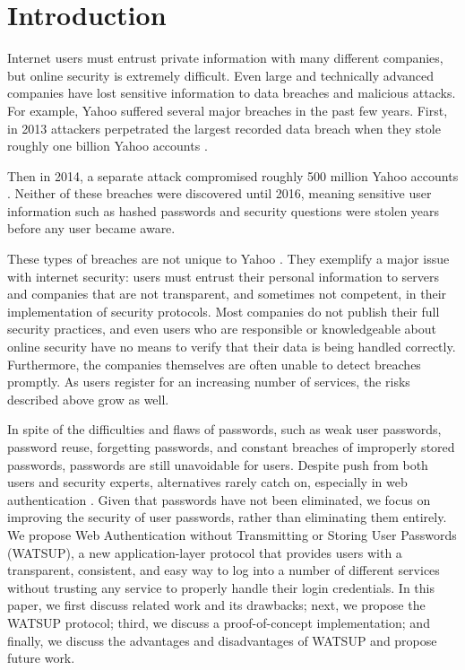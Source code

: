 \section{Introduction}
\label{sec:intro}

Internet users must entrust private information with many different companies, but online security is extremely difficult. Even large and technically advanced companies have lost sensitive information to data breaches and malicious attacks. For example, Yahoo suffered several major breaches in the past few years. First, in 2013 attackers perpetrated the largest recorded data breach when they stole roughly one billion Yahoo accounts \cite{Thielman:2016}.

Then in 2014, a separate attack compromised roughly 500 million Yahoo accounts \cite{Fiegerman:2016}. Neither of these breaches were discovered until 2016, meaning sensitive user information such as hashed passwords and security questions were stolen years before any user became aware.

These types of breaches are not unique to Yahoo \cite{Hunt:2016, Tabachnik:2016}. They exemplify a major issue with internet security: users must entrust their personal information to servers and companies that are not transparent, and sometimes not competent, in their implementation of security protocols. Most companies do not publish their full security practices, and even users who are responsible or knowledgeable about online security have no means to verify that their data is being handled correctly. Furthermore, the companies themselves are often unable to detect breaches promptly. As users register for an increasing number of services, the risks described above grow as well.

In spite of the difficulties and flaws of passwords, such as weak user passwords, password reuse, forgetting passwords, and constant breaches of improperly stored passwords, passwords are still unavoidable for users. Despite push from both users and security experts, alternatives rarely catch on, especially in web authentication \cite{Herley:2011}. Given that passwords have not been eliminated, we focus on improving the security of user passwords, rather than eliminating them entirely.
We propose Web Authentication without Transmitting or Storing User Passwords (WATSUP), a new application-layer protocol that provides users with a transparent, consistent, and easy way to log into a number of different services without trusting any service to properly handle their login credentials. In this paper, we first discuss related work and its drawbacks; next, we propose the WATSUP protocol; third, we discuss a proof-of-concept implementation; and finally, we discuss the advantages and disadvantages of WATSUP and propose future work.
